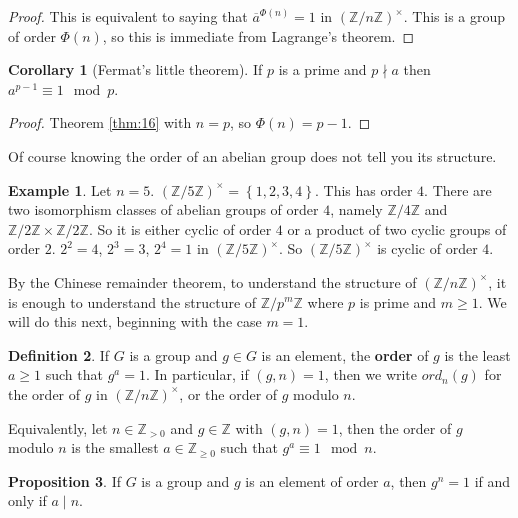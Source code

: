 \documentclass{article}
\newcommand{\Z}{\mathbb{Z}}
\newcommand{\rb}[1]{\left( #1 \right)}
\newcommand{\cb}[1]{\left\{ #1 \right\}}
\newcommand{\unit}[1]{\rb{\Z / #1\Z}^\times}
\theoremstyle{definition}\newtheorem{definition}{Definition}
\theoremstyle{definition}\newtheorem{remark}[definition]{Remark}
\theoremstyle{definition}\newtheorem*{example}{Example}
\theoremstyle{definition}\newtheorem*{note}{Note}
\newtheorem{proposition}[definition]{Proposition}
\newtheorem{corollary}[definition]{Corollary}
\begin{document}
\begin{proof}
This is equivalent to saying that $ \overline{a}^{\Phi\rb{n}} = 1 $ in $ \unit{n} $. This is a group of order $ \Phi\rb{n} $, so this is immediate from Lagrange's theorem.
\end{proof}

\begin{corollary}[Fermat's little theorem]
If $ p $ is a prime and $ p \nmid a $ then $ a^{p - 1} \equiv 1 \mod p $.
\end{corollary}

\begin{proof}
Theorem \ref{thm:16} with $ n = p $, so $ \Phi\rb{n} = p - 1 $.
\end{proof}

Of course knowing the order of an abelian group does not tell you its structure.

\begin{example}
Let $ n = 5 $. $ \unit{5} = \cb{1, 2, 3, 4} $. This has order $ 4 $. There are two isomorphism classes of abelian groups of order $ 4 $, namely $ \Z / 4\Z $ and $ \Z / 2\Z \times \Z / 2\Z $. So it is either cyclic of order $ 4 $ or a product of two cyclic groups of order $ 2 $. $ 2^2 = 4 $, $ 2^3 = 3 $, $ 2^4 = 1 $ in $ \unit{5} $. So $ \unit{5} $ is cyclic of order $ 4 $.
\end{example}

By the Chinese remainder theorem, to understand the structure of $ \unit{n} $, it is enough to understand the structure of $ \Z / p^m\Z $ where $ p $ is prime and $ m \ge 1 $. We will do this next, beginning with the case $ m = 1 $.


\begin{definition}
If $ G $ is a group and $ g \in G $ is an element, the \textbf{order} of $ g $ is the least $ a \ge 1 $ such that $ g^a = 1 $. In particular, if $ \rb{g, n} = 1 $, then we write $ ord_n\rb{g} $ for the order of $ g $ in $ \unit{n} $, or the order of $ g $ modulo $ n $.
\end{definition}

Equivalently, let $ n \in \Z_{> 0} $ and $ g \in \Z $ with $ \rb{g, n} = 1 $, then the order of $ g $ modulo $ n $ is the smallest $ a \in \Z_{\ge 0} $ such that $ g^a \equiv 1 \mod n $.

\begin{proposition}
\label{prop:19}
If $ G $ is a group and $ g $ is an element of order $ a $, then $ g^n = 1 $ if and only if $ a \mid n $.
\end{proposition}
\end{document}
